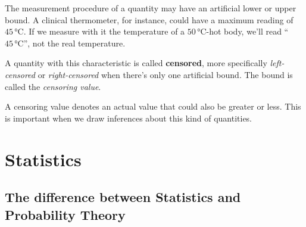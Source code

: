 \documentclass[
  a4paper,
  DIV=11,
  numbers=noendperiod,
  oneside]{scrreprt}
\begin{document}
The measurement procedure of a quantity may have an artificial lower or
upper bound. A clinical thermometer, for instance, could have a maximum
reading of \(45\,\mathrm{°C}\). If we measure with it the temperature of
a \(50\,\mathrm{°C}\)-hot body, we'll read {``\(45\,\mathrm{°C}\)'',}
not the real temperature.

A quantity with this characteristic is called {\textbf{censored}}, more
specifically \emph{left-censored} or \emph{right-censored} when there's
only one artificial bound. The bound is called the \emph{censoring
value}.

A censoring value denotes an actual value that could also be greater or
less. This is important when we draw inferences about this kind of
quantities.

\hypertarget{statistics}{%
\chapter{Statistics}\label{statistics}}

\providecommand{\ul}{\uline}
\renewcommand*{\|}[1][]{\nonscript\:#1\vert\nonscript\:\mathopen{}}
\providecommand*{\pr}[1]{\textsf{\small`#1'}}
\renewcommand*{\pr}[1]{\textsf{\small`#1'}}
\providecommand*{\prq}[1]{\textsf{\small #1}}

\providecommand{\se}[1]{\mathsfit{#1}}
\renewcommand{\se}[1]{\mathsfit{#1}}
\providecommand{\p}{\mathrm{p}}
\renewcommand{\p}{\mathrm{p}}
\renewcommand{\P}{\mathrm{P}}

\providecommand*{\mo}[1][=]{\mathord{\,#1\,}}
\providecommand*{\yX}{\se{X}}
\providecommand*{\yY}{\se{Y}}
\providecommand*{\yI}{\se{I}}
\providecommand{\di}{\mathrm{d}}

\hypertarget{the-difference-between-statistics-and-probability-theory}{%
\section{The difference between Statistics and Probability
Theory}\label{the-difference-between-statistics-and-probability-theory}}
\end{document}

